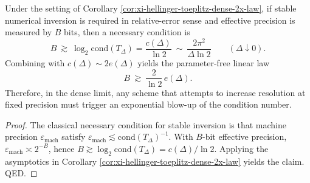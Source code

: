 \begin{corollary}\label{cor:xi-hellinger-toeplitz-bit-budget-linear-law}
Under the setting of Corollary \ref{cor:xi-hellinger-toeplitz-dense-2x-law}, if stable numerical inversion is required in relative-error sense and effective precision is measured by \(B\) bits, then a necessary condition is
\[
\boxed{\;
B\ \gtrsim\ \log_2\mathrm{cond}(T_\Delta)=\frac{c(\Delta)}{\ln 2}
\ \sim\ \frac{2\pi^{2}}{\Delta\ln 2}\qquad(\Delta\downarrow0).\;}
\]
Combining with \(c(\Delta)\sim 2e(\Delta)\) yields the parameter-free linear law
\[
B\ \gtrsim\ \frac{2}{\ln 2}\,e(\Delta).
\]
Therefore, in the dense limit, any scheme that attempts to increase resolution at fixed precision must trigger an exponential blow-up of the condition number.
\end{corollary}
\begin{proof}
The classical necessary condition for stable inversion is that machine precision \(\varepsilon_{\mathrm{mach}}\) satisfy \(\varepsilon_{\mathrm{mach}}\lesssim \mathrm{cond}(T_\Delta)^{-1}\).
With \(B\)-bit effective precision, \(\varepsilon_{\mathrm{mach}}\asymp 2^{-B}\), hence \(B\gtrsim \log_2\mathrm{cond}(T_\Delta)=c(\Delta)/\ln 2\).
Applying the asymptotics in Corollary \ref{cor:xi-hellinger-toeplitz-dense-2x-law} yields the claim. QED.
\end{proof}


